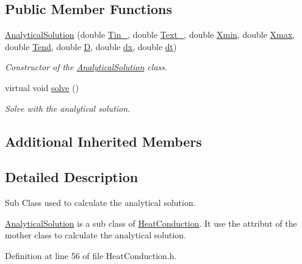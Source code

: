 \subsection*{Public Member Functions}
\begin{DoxyCompactItemize}
\item 
\hyperlink{class_analytical_solution_aaf001fd885d8a79df5609a484aac8430}{Analytical\+Solution} (double \hyperlink{class_heat_conduction_a2487010bf67582643ff59c0c5167725e}{Tin\+\_}, double \hyperlink{class_heat_conduction_aeb50fb3189fd6545f765ef73c9be7889}{Text\+\_}, double \hyperlink{class_heat_conduction_a6ccf374e13ab91b2403db617c9e7a8f0}{Xmin}, double \hyperlink{class_heat_conduction_a187dd05134300536dd9b5418e2957e9a}{Xmax}, double \hyperlink{class_heat_conduction_ab1d00caf79f4c04b420189eaf7c666e1}{Tend}, double \hyperlink{class_heat_conduction_a197d8aa3aa8619edaa640c243bdfc793}{D}, double \hyperlink{class_heat_conduction_a208bf1f475147b07a1f7d28533d78d9c}{dx}, double \hyperlink{class_heat_conduction_a7a7d5f6631039781c80b8c0c60e540e6}{dt})
\begin{DoxyCompactList}\small\item\em Constructor of the \hyperlink{class_analytical_solution}{Analytical\+Solution} class. \end{DoxyCompactList}\item 
virtual void \hyperlink{class_analytical_solution_afd1d8d955abbe0c5b7763544faad8dd2}{solve} ()
\begin{DoxyCompactList}\small\item\em Solve with the analytical solution. \end{DoxyCompactList}\end{DoxyCompactItemize}
\subsection*{Additional Inherited Members}


\subsection{Detailed Description}
Sub Class used to calculate the analytical solution. 

\hyperlink{class_analytical_solution}{Analytical\+Solution} is a sub class of \hyperlink{class_heat_conduction}{Heat\+Conduction}. It use the attribut of the mother class to calculate the analytical solution. 

Definition at line 56 of file Heat\+Conduction.\+h.



